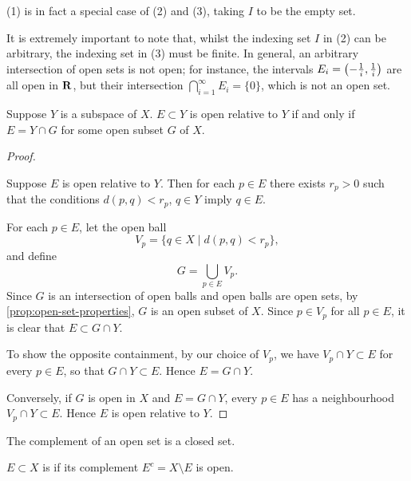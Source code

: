 \begin{remark}
(1) is in fact a special case of (2) and (3), taking $I$ to be the empty set.
\end{remark}

\begin{remark}
It is extremely important to note that, whilst the indexing set $I$ in (2) can be arbitrary, the indexing set in (3) must be finite. In general, an arbitrary intersection of open sets is not open; for instance, the intervals $E_i=\left(-\frac{1}{i},\frac{1}{i}\right)$ are all open in $\mathbf R$, but their intersection $\bigcap_{i=1}^\infty E_i=\{0\}$, which is not an open set.
\end{remark}

\begin{proposition}\label{prop:open-subspace-cap}
Suppose $Y$ is a subspace of $X$. $E\subset Y$ is open relative to $Y$ if and only if $E=Y\cap G$ for some open subset $G$ of $X$.
\end{proposition}

\begin{proof} \

\fbox{$\implies$} Suppose $E$ is open relative to $Y$. Then for each $p\in E$ there exists $r_p>0$ such that the conditions $d(p,q)<r_p$, $q\in Y$ imply $q\in E$.

For each $p\in E$, let the open ball
\[V_p=\{q\in X\mid d(p,q)<r_p\},\]
and define
\[G=\bigcup_{p\in E}V_p.\]
Since $G$ is an intersection of open balls and open balls are open sets, by \cref{prop:open-set-properties}, $G$ is an open subset of $X$. Since $p\in V_p$ for all $p\in E$, it is clear that $E\subset G\cap Y$.

To show the opposite containment, by our choice of $V_p$, we have $V_p\cap Y\subset E$ for every $p\in E$, so that $G\cap Y\subset E$. Hence $E=G\cap Y$.

\fbox{$\impliedby$} Conversely, if $G$ is open in $X$ and $E=G\cap Y$, every $p\in E$ has a neighbourhood $V_p\cap Y\subset E$. Hence $E$ is open relative to $Y$.
\end{proof}

The complement of an open set is a closed set.

\begin{definition}
$E\subset X$ is  if its complement $E^c=X\setminus E$ is open.
\end{definition}


